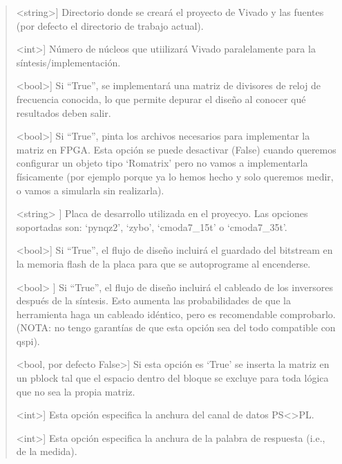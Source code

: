\documentclass[letterpaper,10pt,english]{sphinxmanual}
\begin{document}
\begin{fulllineitems}
\begin{fulllineitems}
\begin{quote}
\begin{description}
\sphinxlineitem{projdir}{[}\textless{}string\textgreater{}{]}
\sphinxAtStartPar
Directorio donde se creará el proyecto de Vivado y las fuentes (por
defecto el directorio de trabajo actual).

\sphinxlineitem{njobs}{[}\textless{}int\textgreater{}{]}
\sphinxAtStartPar
Número de núcleos que utiilizará Vivado paralelamente para la 
síntesis/implementación.

\sphinxlineitem{debug}{[}\textless{}bool\textgreater{}{]}
\sphinxAtStartPar
Si “True”, se implementará una matriz de divisores de reloj de 
frecuencia conocida, lo que permite depurar el diseño al conocer
qué resultados deben salir.

\sphinxlineitem{files}{[}\textless{}bool\textgreater{}{]}
\sphinxAtStartPar
Si “True”, pinta los archivos necesarios para implementar la 
matriz en FPGA. Esta opción se puede desactivar (False) cuando 
queremos configurar un objeto tipo ‘Romatrix’ pero no vamos a 
implementarla físicamente (por ejemplo porque ya lo hemos hecho
y solo queremos medir, o vamos a simularla sin realizarla).

\sphinxlineitem{board}{[}\textless{}string\textgreater{} {]}
\sphinxAtStartPar
Placa de desarrollo utilizada en el proyecyo. Las opciones 
soportadas son: ‘pynqz2’, ‘zybo’, ‘cmoda7\_15t’ o ‘cmoda7\_35t’.

\sphinxlineitem{qspi}{[}\textless{}bool\textgreater{}{]}
\sphinxAtStartPar
Si “True”, el flujo de diseño incluirá el guardado del bitstream
en la memoria flash de la placa para que se auto\sphinxhyphen{}programe al 
encenderse.

\sphinxlineitem{routing}{[}\textless{}bool\textgreater{} {]}
\sphinxAtStartPar
Si “True”, el flujo de diseño incluirá el cableado de los 
inversores después de la síntesis. Esto aumenta las 
probabilidades de que la herramienta haga un cableado idéntico,
pero es recomendable comprobarlo. (NOTA: no tengo garantías de 
que esta opción sea del todo compatible con \sphinxhyphen{}qspi).

\sphinxlineitem{pblock}{[}\textless{}bool, por defecto False\textgreater{}{]}
\sphinxAtStartPar
Si esta opción es ‘True’ se inserta la matriz en un pblock tal que
el espacio dentro del bloque se excluye para toda lógica que no sea
la propia matriz.

\sphinxlineitem{data\_width}{[}\textless{}int\textgreater{}{]}
\sphinxAtStartPar
Esta opción especifica la anchura del canal de datos PS\textless{}\textendash{}\textgreater{}PL.

\sphinxlineitem{buffer\_out\_width}{[}\textless{}int\textgreater{}{]}
\sphinxAtStartPar
Esta opción especifica la anchura de la palabra de respuesta 
(i.e., de la medida).


\end{description}
\end{quote}
\end{fulllineitems}
\end{fulllineitems}
\end{document}
